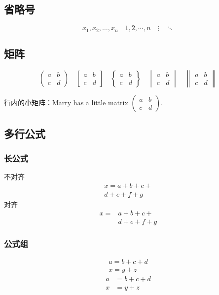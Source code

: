 \subsection{省略号}
\[ x_1,x_2,\dots ,x_n\quad 1,2,\cdots ,n\quad
\vdots\quad \ddots \]

\subsection{矩阵}
\[ \begin{pmatrix} a&b\\c&d \end{pmatrix} \quad
\begin{bmatrix} a&b\\c&d \end{bmatrix} \quad
\begin{Bmatrix} a&b\\c&d \end{Bmatrix} \quad
\begin{vmatrix} a&b\\c&d \end{vmatrix} \quad
\begin{Vmatrix} a&b\\c&d \end{Vmatrix} \]

行内的小矩阵：Marry has a little matrix $ ( \begin{smallmatrix} a&b\\c&d \end{smallmatrix} ) $.

\subsection{多行公式}

\subsubsection{长公式}
不对齐
\begin{multline}
x = a+b+c+{} \\
d+e+f+g
\end{multline}
对齐
\[\begin{aligned}
x ={}& a+b+c+{} \\
&d+e+f+g
\end{aligned}\]

\subsubsection{公式组}
\begin{gather}
a = b+c+d \\
x = y+z
\end{gather}
\begin{align}
a &= b+c+d \\
x &= y+z
\end{align}

